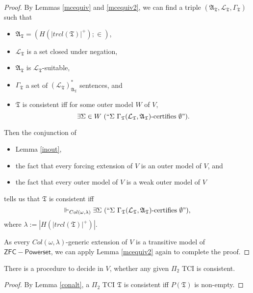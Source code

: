 \documentclass[12pt]{article}
\numberwithin{equation}{section}
\begin{document}
\begin{proof}
By Lemmas \ref{mcequiv} and \ref{mcequiv2}, we can find a triple $(\mathfrak{A}_{\mathfrak{T}}, \mathcal{L}_{\mathfrak{T}}, \Gamma_{\mathfrak{T}})$ such that 
\begin{itemize}
    \item $\mathfrak{A}_{\mathfrak{T}} = (H(|trcl(\mathfrak{T})|^+); \in)$,
    \item $\mathcal{L}_{\mathfrak{T}}$ is a set closed under negation, 
    \item $\mathfrak{A}_{\mathfrak{T}}$ is $\mathcal{L}_{\mathfrak{T}}$-suitable, 
    \item $\Gamma_{\mathfrak{T}}$ a set of $({\mathcal{L}_{\mathfrak{T}}})^*_{\mathfrak{A}_{\mathfrak{T}}}$ sentences, and
    \item $\mathfrak{T}$ is consistent iff for some outer model $W$ of $V$, $$\exists \Sigma \in W \ (``\Sigma \ \Gamma_{\mathfrak{T}} (\mathcal{L}_{\mathfrak{T}}, \mathfrak{A}_{\mathfrak{T}})\text{-certifies } \emptyset").$$
\end{itemize}
Then the conjunction of
\begin{itemize}
    \item Lemma \ref{inout},
    \item the fact that every forcing extension of $V$ is an outer model of $V$, and
    \item the fact that every outer model of $V$ is a weak outer model of $V$
\end{itemize}   
tells us that $\mathfrak{T}$ is consistent iff $$\Vdash_{Col(\omega, \lambda)} \exists \Sigma \ (``\Sigma \ \Gamma_{\mathfrak{T}} (\mathcal{L}_{\mathfrak{T}}, \mathfrak{A}_{\mathfrak{T}})\text{-certifies } \emptyset"),$$ where $\lambda := |H(|trcl(\mathfrak{T})|^+)|$. 

As every $Col(\omega, \lambda)$-generic extension of $V$ is a transitive model of $\mathsf{ZFC - Powerset}$, we can apply Lemma \ref{mcequiv2} again to complete the proof. 
\end{proof}

\begin{cor}\label{cor527}
There is a procedure to decide in $V$, whether any given $\Pi_2$ TCI is consistent.
\end{cor}

\begin{proof}
By Lemma \ref{conalt}, a $\Pi_2$ TCI $\mathfrak{T}$ is consistent iff $P(\mathfrak{T})$ is non-empty.
\end{proof} 
\end{document}
